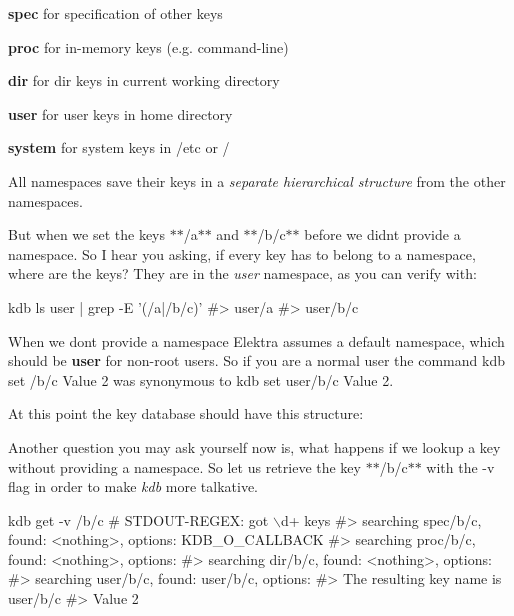 \begin{DoxyItemize}
\item {\bfseries spec} for specification of other keys
\item {\bfseries proc} for in-\/memory keys (e.\+g. command-\/line)
\item {\bfseries dir} for dir keys in current working directory
\item {\bfseries user} for user keys in home directory
\item {\bfseries system} for system keys in {\ttfamily /etc} or {\ttfamily /}
\end{DoxyItemize}

All namespaces save their keys in a {\itshape separate hierarchical structure} from the other namespaces.

But when we set the keys $\ast$$\ast$/a$\ast$$\ast$ and $\ast$$\ast$/b/c$\ast$$\ast$ before we didn\textquotesingle{}t provide a namespace. So I hear you asking, if every key has to belong to a namespace, where are the keys? They are in the {\itshape user} namespace, as you can verify with\+:


\begin{DoxyCode}
kdb ls user | grep -E '(/a|/b/c)'
#> user/a
#> user/b/c
\end{DoxyCode}


When we don\textquotesingle{}t provide a namespace Elektra assumes a default namespace, which should be {\bfseries user} for non-\/root users. So if you are a normal user the command {\ttfamily kdb set /b/c \textquotesingle{}Value 2\textquotesingle{}} was synonymous to {\ttfamily kdb set user/b/c \textquotesingle{}Value 2\textquotesingle{}}.

At this point the key database should have this structure\+: 

Another question you may ask yourself now is, what happens if we lookup a key without providing a namespace. So let us retrieve the key $\ast$$\ast$/b/c$\ast$$\ast$ with the -\/v flag in order to make {\itshape kdb} more talkative.


\begin{DoxyCode}
kdb get -v /b/c
# STDOUT-REGEX: got \(\backslash\)d+ keys
#>  searching spec/b/c, found: <nothing>, options: KDB\_O\_CALLBACK
#>  searching proc/b/c, found: <nothing>, options:
#>  searching dir/b/c, found: <nothing>, options:
#>  searching user/b/c, found: user/b/c, options:
#> The resulting key name is user/b/c
#> Value 2
\end{DoxyCode}


